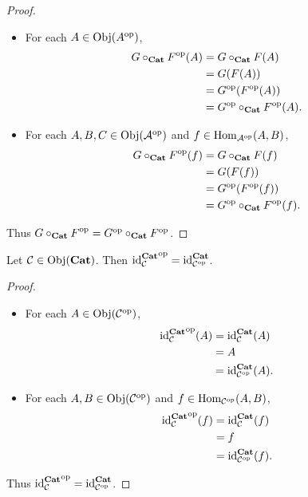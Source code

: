 \documentclass{book}
\begin{document}
	\begin{proof}\
		\begin{itemize}
			\item For each $A \in \Obj(\op{A})$, 
			\begin{align*}
				\op{G \circ_{\bCat} F}(A)
				& = G \circ_{\bCat} F(A) \\
				& = G(F(A)) \\
				& = \op{G}(\op{F}(A)) \\
				& = \op{G} \circ_{\bCat} \op{F}(A).
			\end{align*}
			\item For each $A,B,C \in \Obj(\op{\MA})$ and $f \in \Hom_{\op{\MA}}(A,B)$,
			\begin{align*}
				\op{G \circ_{\bCat} F}(f) 
				& = G \circ_{\bCat} F(f) \\
				& = G(F(f)) \\
				& = \op{G}(\op{F}(f)) \\
				& = \op{G} \circ_{\bCat} \op{F}(f).
			\end{align*}
		\end{itemize}
		Thus $\op{G \circ_{\bCat} F} = \op{G} \circ_{\bCat} \op{F}$.
	\end{proof}
	
	\begin{ex} 
		Let $\MC \in \Obj(\bCat)$. Then $\op{\id_{\MC}^{\bCat}} = \id_{\op{\MC}}^{\bCat}$.
	\end{ex}
	
	\begin{proof}
		\begin{itemize}
			\item For each $A \in \Obj(\op{\MC})$,
			\begin{align*}
				\op{\id_{\MC}^{\bCat}}(A)
				& = \id_{\MC}^{\bCat}(A) \\
				& = A \\
				& = \id_{\op{\MC}}^{\bCat}(A).
			\end{align*}
			\item For each $A,B \in \Obj(\op{\MC})$ and $f \in \Hom_{\op{\MC}}(A,B)$,
			\begin{align*}
				\op{\id_{\MC}^{\bCat}}(f)
				& = \id_{\MC}^{\bCat}(f) \\
				& = f \\
				& = \id_{\op{\MC}}^{\bCat}(f).
			\end{align*}
		\end{itemize}
		Thus $\op{\id_{\MC}^{\bCat}} = \id_{\op{\MC}}^{\bCat}$.
	\end{proof}
	
\end{document}
